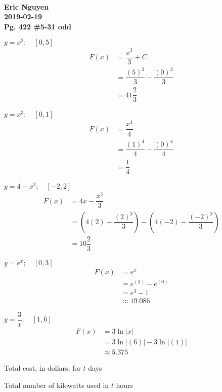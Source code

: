 \documentclass[12pt]{article}
\newenvironment{problem}[2][]{
    \begin{trivlist}
        \item[
            {\bfseries #1}
            {\bfseries #2.}
        ]
}{\end{trivlist}}
\newcommand{\assignment}{Pg. 422 \#5-31 odd}
\newcommand{\name}{Eric Nguyen}
\newcommand{\duedate}{2019-02-19}
\newcommand{\details}{\textbf{\\\name \\\duedate \\\assignment}}
\begin{document}
\details

\begin{problem}{5}
$y = x^2; \quad [0, 5]$
\begin{align}
F(x) &= \dfrac{x^3}{3} + C \\
&= \dfrac{(5)^3}{3} - \dfrac{(0)^3}{3} \\
&= 41 \dfrac{2}{3}
\end{align}
\end{problem}

\begin{problem}{7}
$y = x^3; \quad [0, 1]$
\begin{align}
F(x) &= \dfrac{x^4}{4} \\
&= \dfrac{(1)^4}{4} - \dfrac{(0)^4}{4} \\
&= \dfrac{1}{4}
\end{align}
\end{problem}

\begin{problem}{9}
$y = 4 - x^2; \quad [-2, 2]$
\begin{align}
F(x) &= 4x - \dfrac{x^3}{3} \\
&= \left(4(2) - \dfrac{(2)^3}{3}\right) - \left(4(-2) - \dfrac{(-2)^3}{3}\right) \\
&= 10 \dfrac{2}{3}
\end{align}
\end{problem}

\begin{problem}{11}
$y = e^x; \quad [0, 3]$
\begin{align}
F(x) &= e^x \\
&= e^{(3)} - e^{(0)} \\
&= e^3 - 1 \\
&\approx 19.086
\end{align}
\end{problem}

\begin{problem}{13}
$y = \dfrac{3}{x}; \quad [1, 6]$
\begin{align}
F(x) &= 3 \ln{|x|} \\
&= 3 \ln{|(6)|} - 3 \ln{|(1)|} \\
&\approx 5.375
\end{align}
\end{problem}

\begin{problem}{15}
Total cost, in dollars, for $t$ days
\end{problem}

\begin{problem}{17}
Total number of kilowatts used in $t$ hours
\end{problem}
\end{document}
